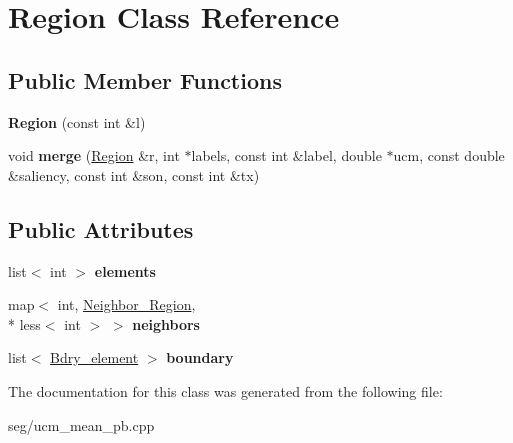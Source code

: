 \hypertarget{class_region}{\section{Region Class Reference}
\label{class_region}
}
\subsection*{Public Member Functions}
\begin{DoxyCompactItemize}
\item 
\hypertarget{class_region_a962a7ed95755781840b7a729b923a02a}{{\bfseries Region} (const int \&l)}\label{class_region_a962a7ed95755781840b7a729b923a02a}

\item 
\hypertarget{class_region_aea78b90c11970388e45110b65e6eb32e}{void {\bfseries merge} (\hyperlink{class_region}{Region} \&r, int $\ast$labels, const int \&label, double $\ast$ucm, const double \&saliency, const int \&son, const int \&tx)}\label{class_region_aea78b90c11970388e45110b65e6eb32e}

\end{DoxyCompactItemize}
\subsection*{Public Attributes}
\begin{DoxyCompactItemize}
\item 
\hypertarget{class_region_ad99b29221d93ce976921830a9f072e04}{list$<$ int $>$ {\bfseries elements}}\label{class_region_ad99b29221d93ce976921830a9f072e04}

\item 
\hypertarget{class_region_a5a1d4d94e64f0ac7ebdd731070510818}{map$<$ int, \hyperlink{class_neighbor___region}{Neighbor\-\_\-\-Region}, \\*
less$<$ int $>$ $>$ {\bfseries neighbors}}\label{class_region_a5a1d4d94e64f0ac7ebdd731070510818}

\item 
\hypertarget{class_region_a3ed6b3ca4f425d611b354d29583c4d23}{list$<$ \hyperlink{class_bdry__element}{Bdry\-\_\-element} $>$ {\bfseries boundary}}\label{class_region_a3ed6b3ca4f425d611b354d29583c4d23}

\end{DoxyCompactItemize}


The documentation for this class was generated from the following file\-:\begin{DoxyCompactItemize}
\item 
seg/ucm\-\_\-mean\-\_\-pb.\-cpp\end{DoxyCompactItemize}
